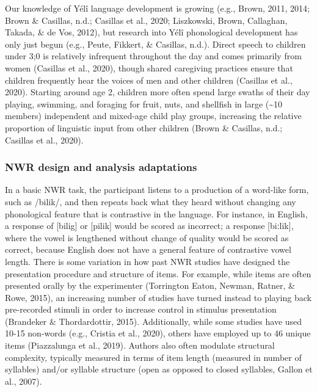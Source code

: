 \documentclass[english,,man,floatsintext]{apa6}
\begin{document}
Our knowledge of Yélî language development is growing (e.g., Brown, 2011, 2014; Brown \& Casillas, n.d.; Casillas et al., 2020; Liszkowski, Brown, Callaghan, Takada, \& de Vos, 2012), but research into Yélî phonological development has only just begun (e.g., Peute, Fikkert, \& Casillas, n.d.). Direct speech to children under 3;0 is relatively infrequent throughout the day and comes primarily from women (Casillas et al., 2020), though shared caregiving practices ensure that children frequently hear the voices of men and other children (Casillas et al., 2020). Starting around age 2, children more often spend large swaths of their day playing, swimming, and foraging for fruit, nuts, and shellfish in large (\textasciitilde{}10 members) independent and mixed-age child play groups, increasing the relative proportion of linguistic input from other children (Brown \& Casillas, n.d.; Casillas et al., 2020).

\hypertarget{nwr-design-and-analysis-adaptations}{%
\subsubsection{NWR design and analysis adaptations}\label{nwr-design-and-analysis-adaptations}}

In a basic NWR task, the participant listens to a production of a word-like form, such as /bilik/, and then repeats back what they heard without changing any phonological feature that is contrastive in the language. For instance, in English, a response of {[}bilig{]} or {[}pilik{]} would be scored as incorrect; a response {[}biːlik{]}, where the vowel is lengthened without change of quality would be scored as correct, because English does not have a general feature of contrastive vowel length. There is some variation in how past NWR studies have designed the presentation procedure and structure of items. For example, while items are often presented orally by the experimenter (Torrington Eaton, Newman, Ratner, \& Rowe, 2015), an increasing number of studies have turned instead to playing back pre-recorded stimuli in order to increase control in stimulus presentation (Brandeker \& Thordardottir, 2015). Additionally, while some studies have used 10-15 non-words (e.g., Cristia et al., 2020), others have employed up to 46 unique items (Piazzalunga et al., 2019). Authors also often modulate structural complexity, typically measured in terms of item length (measured in number of syllables) and/or syllable structure (open as opposed to closed syllables, Gallon et al., 2007).
\end{document}

